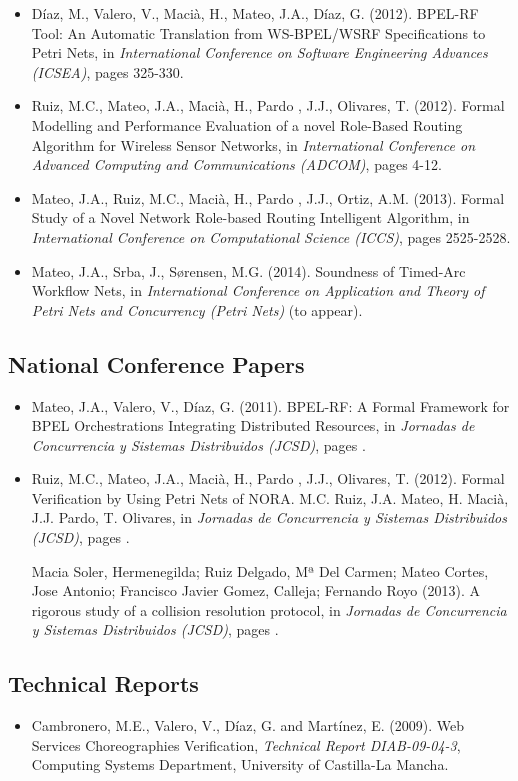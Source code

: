 \begin{itemize}
%
\item
D\'iaz, M., Valero, V., Maci\`a, H., Mateo, J.A., D\'iaz, G. (2012). BPEL-RF Tool: An Automatic Translation from WS-BPEL/WSRF Specifications to Petri Nets, in
\emph{International Conference on Software Engineering Advances (ICSEA)}, pages 325-330.
%
\item Ruiz, M.C., Mateo, J.A., Maci\`a, H., Pardo , J.J., Olivares, T. (2012). Formal Modelling and Performance Evaluation of a novel Role-Based Routing Algorithm for Wireless Sensor Networks, in \emph{International Conference on Advanced Computing and Communications (ADCOM)}, pages 4-12.  
%
\item Mateo, J.A., Ruiz, M.C., Maci\`a, H., Pardo , J.J., Ortiz, A.M. (2013).
Formal Study of a Novel Network Role-based Routing Intelligent Algorithm, in \emph{International Conference on Computational Science (ICCS)}, 
pages 2525-2528.       
%
\item  Mateo, J.A., Srba, J., S{\o}rensen, M.G. (2014). Soundness of Timed-Arc Workflow Nets, in \emph{International Conference on
Application and Theory of Petri Nets and Concurrency (Petri Nets)} (to appear).
\end{itemize}
%
\subsection{National Conference Papers}
%
\begin{itemize}
%
\item Mateo, J.A., Valero, V., D\'iaz, G. (2011). BPEL-RF: A Formal Framework for BPEL Orchestrations Integrating Distributed Resources, in
\emph{Jornadas de Concurrencia y Sistemas Distribuidos (JCSD)}, pages .      

\item Ruiz, M.C., Mateo, J.A., Maci\`a, H., Pardo , J.J., Olivares, T. (2012). Formal Verification by Using Petri Nets of NORA. M.C. Ruiz, J.A. Mateo, H. Macià, J.J. Pardo, T. Olivares, in \emph{Jornadas de Concurrencia y Sistemas Distribuidos (JCSD)}, pages .

Macia Soler, Hermenegilda; Ruiz Delgado, Mª Del Carmen; Mateo Cortes, Jose Antonio; Francisco Javier Gomez, Calleja; Fernando Royo (2013). 
A rigorous study of a collision resolution protocol, in \emph{Jornadas de Concurrencia y Sistemas Distribuidos (JCSD)}, pages .  
\end{itemize}
%
\subsection{Technical Reports}
%
\begin{itemize}
%
\item Cambronero, M.E., Valero, V., D\'iaz, G. and Mart\'inez, E. (2009). Web Services Choreographies Verification, \emph{Technical Report DIAB-09-04-3}, Computing Systems Department, University of Castilla-La Mancha.
%
%
\end{itemize}
%
